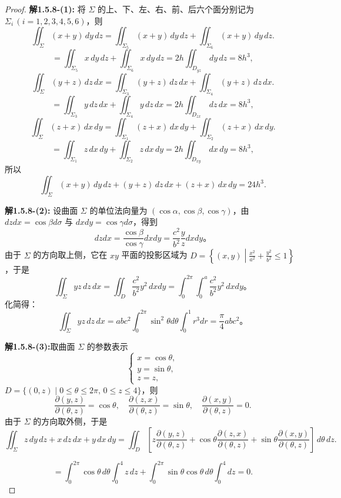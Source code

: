 \documentclass[12pt]{ctexart}
\begin{document}
\begin{proof}
	\textbf{解1.5.8-(1):} 将 $\Sigma$ 的上、下、左、右、前、后六个面分别记为 $\Sigma_i \, (i = 1, 2, 3, 4, 5, 6)$，则
\[
\iint_\Sigma (x + y) \, dy \, dz
= \iint_{\Sigma_5} (x + y) \, dy \, dz + \iint_{\Sigma_6} (x + y) \, dy \, dz.
\]
\[
= \iint_{\Sigma_5} x \, dy \, dz + \iint_{\Sigma_6} x \, dy \, dz 
= 2h \iint_{D_{yz}} \, dy \, dz = 8h^3,
\]
\[
\iint_\Sigma (y + z) \, dz \, dx
= \iint_{\Sigma_3} (y + z) \, dz \, dx + \iint_{\Sigma_4} (y + z) \, dz \, dx.
\]
\[
= \iint_{\Sigma_3} y \, dz \, dx + \iint_{\Sigma_4} y \, dz \, dx 
= 2h \iint_{D_{zx}} \, dz \, dx = 8h^3,
\]
\[
\iint_\Sigma (z + x) \, dx \, dy
= \iint_{\Sigma_1} (z + x) \, dx \, dy + \iint_{\Sigma_2} (z + x) \, dx \, dy.
\]
\[
= \iint_{\Sigma_1} z \, dx \, dy + \iint_{\Sigma_2} z \, dx \, dy 
= 2h \iint_{D_{xy}} \, dx \, dy = 8h^3,
\]
所以
\[
\iint_\Sigma (x + y) \, dy \, dz + (y + z) \, dz \, dx 
+ (z + x) \, dx \, dy = 24h^3.
\]

\textbf{解1.5.8-(2):} 设曲面 $\Sigma$ 的单位法向量为 $(\cos \alpha, \cos \beta, \cos \gamma)$，由 $dz dx = \cos \beta d\sigma$ 与 $dx dy = \cos \gamma d\sigma$，得到
\[
dz dx = \frac{\cos \beta}{\cos \gamma} dx dy = \frac{c^2}{b^2} \frac{y}{z} dx dy。
\]
由于 $\Sigma$ 的方向取上侧，它在 $xy$ 平面的投影区域为 $D = \left\{ (x, y) \middle| \frac{x^2}{a^2} + \frac{y^2}{b^2} \leq 1 \right\}$，于是
\[
\iint_\Sigma yz \, dz \, dx = \iint_D \frac{c^2}{b^2} y^2 \, dx dy = \int_0^{2\pi} \int_0^a \frac{c^2}{b^2} y^2 \, dx dy。
\]
化简得：
\[
\iint_\Sigma yz \, dz \, dx = abc^2 \int_0^{2\pi} \sin^2 \theta d\theta \int_0^1 r^3 dr = \frac{\pi}{4} abc^2。
\]

\textbf{解1.5.8-(3):}取曲面 $\Sigma$ 的参数表示
\[
\begin{cases}
x = \cos \theta, \\
y = \sin \theta, \\
z = z,
\end{cases}
\]
$D = \{(0, z) \mid 0 \leq \theta \leq 2\pi, \, 0 \leq z \leq 4\}$，则
\[
\frac{\partial (y, z)}{\partial (\theta, z)} = \cos \theta, \quad
\frac{\partial (z, x)}{\partial (\theta, z)} = \sin \theta, \quad
\frac{\partial (x, y)}{\partial (\theta, z)} = 0.
\]
由于 $\Sigma$ 的方向取外侧，于是
\[
\iint_\Sigma z \, dy \, dz + x \, dz \, dx + y \, dx \, dy
= \iint_D \left[z \frac{\partial (y, z)}{\partial (\theta, z)} 
+ \cos \theta \frac{\partial (z, x)}{\partial (\theta, z)} 
+ \sin \theta \frac{\partial (x, y)}{\partial (\theta, z)} \right] \, d\theta \, dz.
\]

\[
= \int_0^{2\pi} \cos \theta \, d\theta \int_0^4 z \, dz
+ \int_0^{2\pi} \sin \theta \cos \theta \, d\theta \int_0^4 dz = 0.
\]


\end{proof}
\end{document}
